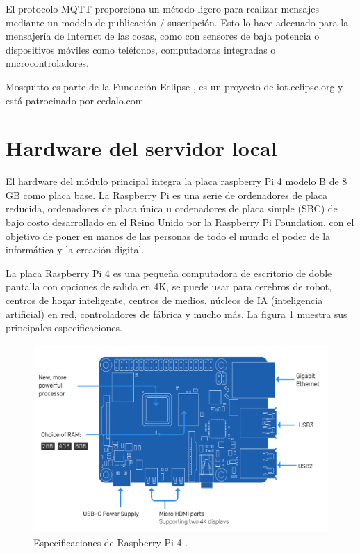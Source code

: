 El protocolo MQTT proporciona un método ligero para realizar mensajes mediante un modelo de publicación / suscripción. Esto lo hace adecuado para la mensajería de Internet de las cosas, como con sensores de baja potencia o dispositivos móviles como teléfonos, computadoras integradas o microcontroladores.

Mosquitto es parte de la Fundación Eclipse , es un proyecto de iot.eclipse.org y está patrocinado por cedalo.com. 

\section{Hardware del servidor local} 

El hardware del módulo principal integra la placa raspberry Pi 4 modelo B de 8 GB como placa base. La Raspberry Pi es una serie de ordenadores de placa reducida, ordenadores de placa única u ordenadores de placa simple (SBC) de bajo costo desarrollado en el Reino Unido por la Raspberry Pi Foundation, con el objetivo de poner en manos de las personas de todo el mundo el poder de la informática y la creación digital.

La placa Raspberry Pi 4 es una pequeña computadora de escritorio de doble pantalla con opciones de salida en 4K, se puede usar para cerebros de robot, centros de hogar inteligente, centros de medios, núcleos de IA (inteligencia artificial) en red, controladores de fábrica y mucho más. La figura \ref{fig:rpi4} muestra sus principales especificaciones.

\vspace{0.5cm}

\begin{figure}[htbp]
	\centering
	\includegraphics[width=.95\textwidth]{./Figures/rpi4.png}
	\caption{Especificaciones de Raspberry Pi 4 \protect\footnotemark.}

	\label{fig:rpi4}
\end{figure}

